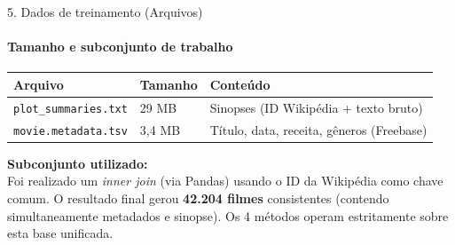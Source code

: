 \documentclass[10pt, aspectratio=169]{beamer}
\begin{document}
\begin{frame}{5. Dados de treinamento (Arquivos)}
    \framesubtitle{Tamanho e subconjunto de trabalho}
    \begin{table}[]
        \centering
        \small
        \begin{tabular}{@{}p{4cm} p{1.5cm} p{7.5cm}@{}}
            \toprule
            \textbf{Arquivo} & \textbf{Tamanho} & \textbf{Conteúdo} \\
            \midrule
            \texttt{plot\_summaries.txt} & 29 MB & Sinopses (ID Wikipédia + texto bruto) \\
            \texttt{movie.metadata.tsv} & 3,4 MB & Título, data, receita, gêneros (Freebase) \\
            \bottomrule
        \end{tabular}
    \end{table}
    \vspace{0.2cm}
    \textbf{Subconjunto utilizado:} \\
    Foi realizado um \textit{inner join} (via Pandas) usando o ID da Wikipédia como chave comum. O resultado final gerou \textbf{42.204 filmes} consistentes (contendo simultaneamente metadados e sinopse). Os 4 métodos operam estritamente sobre esta base unificada.
\end{frame}
\end{document}
